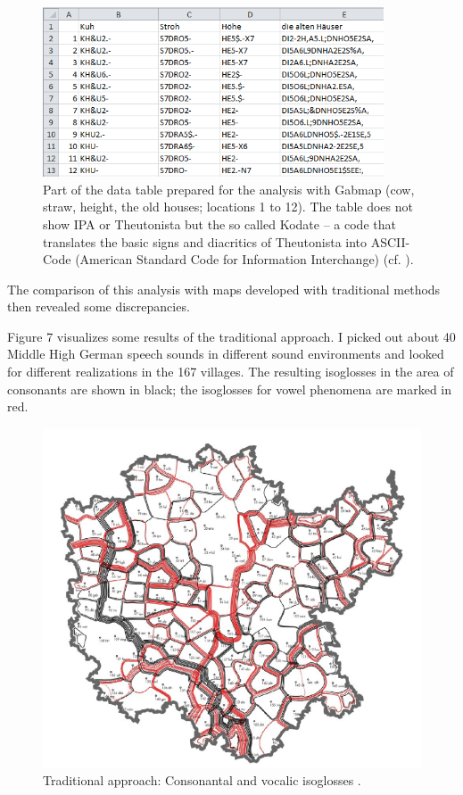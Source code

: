 \documentclass[output=paper]{LSP/langsci}
\begin{document}
\begin{figure}
\includegraphics[width=0.9\textwidth]{illustrations/mathus_fig6}
\caption{Part of the data table prepared for the analysis with Gabmap (cow, straw, height, the old houses; locations 1 to 12).
The table does not show IPA or Theutonista but the so called {\textquotedbl}Kodate{\textquotedbl} – a code that translates the basic signs and diacritics of Theutonista into ASCII-Code (American Standard Code for Information Interchange) (cf. \citealt[38--40]{reichel_elektronische_2013}).}
\label{fig:6}
\end{figure}

The comparison of this analysis with maps developed with traditional methods then revealed some discrepancies.

Figure 7 visualizes some results of the traditional approach. I picked out about 40 Middle High German speech sounds in different sound environments and looked for different realizations in the 167 villages. The resulting isoglosses in the area of consonants are shown in black; the isoglosses for vowel phenomena are marked in red.

\begin{figure}
\includegraphics[width=.7\textwidth]{illustrations/mathus_fig7}
\caption{Traditional approach: Consonantal and vocalic isoglosses \citep[107]{mathussek_sprachraume_2014}.}
\label{fig:7}
\end{figure}
\end{document}
